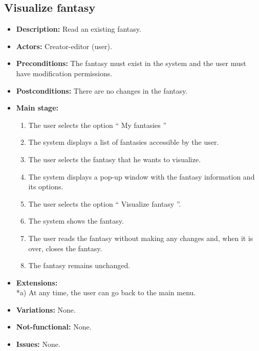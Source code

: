 \subsection{Visualize fantasy}
\begin{itemize}
	\item \textbf{Description:} Read an existing fantasy.
	\item \textbf{Actors:} Creator-editor (user).
	\item \textbf{Preconditions:} The fantasy must exist in the system and the user must have modification permissions.
	\item \textbf{Postconditions:} There are no changes in the fantasy.
	\item \textbf{Main stage:}
	\begin{enumerate}
		\item The user selects the option `` My fantasies ''
		\item The system displays a list of fantasies accessible by the user.
		\item The user selects the fantasy that he wants to visualize.
		\item The system displays a pop-up window with the fantasy information and its options.
		\item The user selects the option `` Visualize fantasy ''.
		\item The system shows the fantasy.
		\item The user reads the fantasy without making any changes and, when it is over, closes the fantasy.
		\item The fantasy remains unchanged.
	\end{enumerate}
	\item \textbf{Extensions:} \\ *a) At any time, the user can go back to the main menu.
	\item \textbf{Variations:} None.
	\item \textbf{Not-functional:} None.
	\item \textbf{Issues:} None.
\end{itemize}

